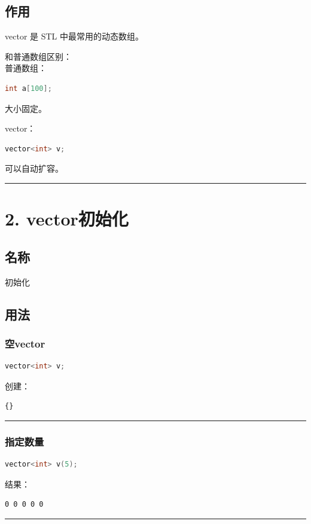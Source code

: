 \documentclass[10pt,twocolumn]{extarticle}
\begin{document}
\subsection{作用}
vector 是 STL 中最常用的动态数组。

和普通数组区别：\\
普通数组：
\begin{lstlisting}[language=C++]
int a[100];
\end{lstlisting}
大小固定。

vector：
\begin{lstlisting}[language=C++]
vector<int> v;
\end{lstlisting}
可以自动扩容。

\noindent\rule{\linewidth}{0.4pt}

\section{2. vector初始化}

\subsection{名称}
初始化

\subsection{用法}

\subsubsection{空vector}
\begin{lstlisting}[language=C++]
vector<int> v;
\end{lstlisting}
创建：
\begin{lstlisting}
{}
\end{lstlisting}

\noindent\rule{\linewidth}{0.4pt}

\subsubsection{指定数量}
\begin{lstlisting}[language=C++]
vector<int> v(5);
\end{lstlisting}
结果：
\begin{lstlisting}
0 0 0 0 0
\end{lstlisting}

\noindent\rule{\linewidth}{0.4pt}
\end{document}
